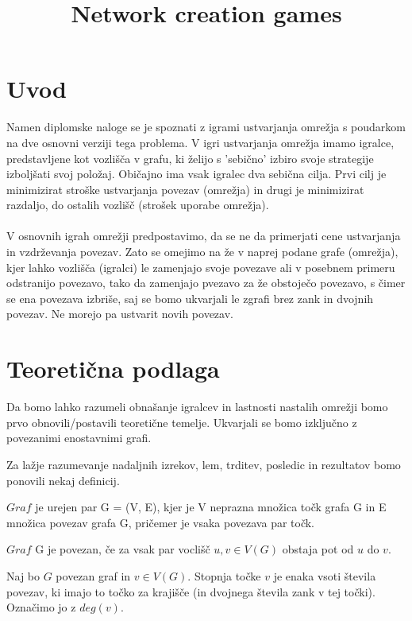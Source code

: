 \documentclass[fin1, tisk]{fmfdelo}
\title{Network creation games}
\begin{document}
\section{Uvod}

Namen diplomske naloge se je spoznati z igrami ustvarjanja omrežja s poudarkom na dve osnovni verziji tega problema.
V igri ustvarjanja omrežja imamo igralce, predstavljene kot vozlišča v grafu, ki želijo s 'sebično' izbiro svoje
strategije izboljšati svoj položaj. Običajno ima vsak igralec dva sebična cilja. Prvi cilj je minimizirat stroške
ustvarjanja povezav (omrežja) in drugi je minimizirat razdaljo, do ostalih vozlišč (strošek uporabe omrežja).\\

\\
V osnovnih igrah omrežji predpostavimo, da se ne da primerjati cene ustvarjanja in vzdrževanja povezav. Zato se
omejimo na že v naprej podane grafe (omrežja), kjer lahko vozlišča (igralci) le zamenjajo svoje povezave ali v
posebnem primeru odstranijo povezavo, tako da zamenjajo pvezavo za že obstoječo povezavo, s čimer se ena povezava
izbriše, saj se bomo ukvarjali le zgrafi brez zank in dvojnih povezav. Ne morejo pa ustvarit novih povezav.

\section{Teoretična podlaga}
Da bomo lahko razumeli obnašanje igralcev in lastnosti nastalih omrežji bomo prvo obnovili/postavili teoretične temelje. 
Ukvarjali se bomo izključno z povezanimi enostavnimi grafi.

Za lažje razumevanje nadaljnih izrekov, lem, trditev, posledic in rezultatov bomo ponovili nekaj definicij.

\begin{definicija}
$Graf$ je urejen par G = (V, E), kjer je V neprazna množica točk grafa G in E množica povezav grafa G, pričemer je vsaka povezava par točk.
\end{definicija}

\begin{definicija}
$Graf$ G je povezan, če za vsak par voclišč $u, v \in V(G)$ obstaja pot od $u$ do $v$.
\end{definicija}

\begin{definicija}
Naj bo $G$ povezan graf in $v \in V(G)$. Stopnja točke $v$ je enaka vsoti števila povezav, ki imajo to točko za krajišče (in dvojnega števila zank v tej točki).
Označimo jo z $deg(v)$.
\end{definicija}
\end{document}
